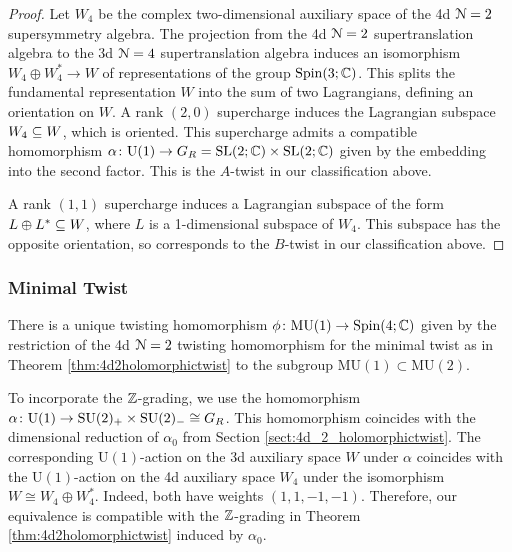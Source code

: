 \documentclass[10pt, oneside]{article}
\newcommand{\MU}{\mathrm{MU}}
\renewcommand{\U}{\mathrm{U}}
\begin{document}
\begin{proof}
Let $W_4$ be the complex two-dimensional auxiliary space of the 4d $\mathcal N=2$ supersymmetry algebra.
The projection from the 4d $\mathcal{N}=2$ supertranslation algebra to the 3d $\mathcal{N}=4$ supertranslation algebra induces an isomorphism $W_4 \oplus W_4^* \to W$ of representations of the group $\mathrm{Spin}(3;\mathbb C)$.  
This splits the fundamental representation $W$ into the sum of two Lagrangians, defining an orientation on $W$. 
A rank $(2,0)$ supercharge induces the Lagrangian subspace $W_4 \subseteq W$, which is oriented.  This supercharge admits a compatible homomorphism $\alpha \colon \U(1) \to G_R = \SL(2;\CC) \times \SL(2;\CC)$ given by the embedding into the second factor. This is the $A$-twist in our classification above.

A rank $(1,1)$ supercharge induces a Lagrangian subspace of the form $L \oplus L^* \subseteq W$, where $L$ is a 1-dimensional subspace of $W_4$.  This subspace has the opposite orientation, so corresponds to the $B$-twist in our classification above.  
\end{proof}

\subsubsection{Minimal Twist}
\label{sect:3d_4_minimal_twist}
There is a unique twisting homomorphism $\phi \colon \MU(1) \to \Spin(4;\CC)$ given by the restriction of the 4d $\mathcal N=2$ twisting homomorphism for the minimal twist as in Theorem \ref{thm:4d2holomorphictwist} to the subgroup $\MU(1) \subset \MU(2)$. 

To incorporate the $\mathbb Z$-grading, we use the homomorphism $\alpha \colon \mathrm{U}(1) \to \mathrm{SU}(2)_+ \times \mathrm{SU}(2)_- \cong G_R$. This homomorphism coincides with the dimensional reduction of $\alpha_0$ from Section \ref{sect:4d_2_holomorphictwist}. The corresponding $\U(1)$-action on the 3d auxiliary space $W$ under $\alpha$ coincides with the $\U(1)$-action on the 4d auxiliary space $W_4$ under the isomorphism $W\cong W_4\oplus W_4^*$. Indeed, both have weights $(1,1,-1,-1)$.  Therefore, our equivalence is compatible with the $\mathbb Z$-grading in Theorem \ref{thm:4d2holomorphictwist} induced by $\alpha_0$.
\end{document}
